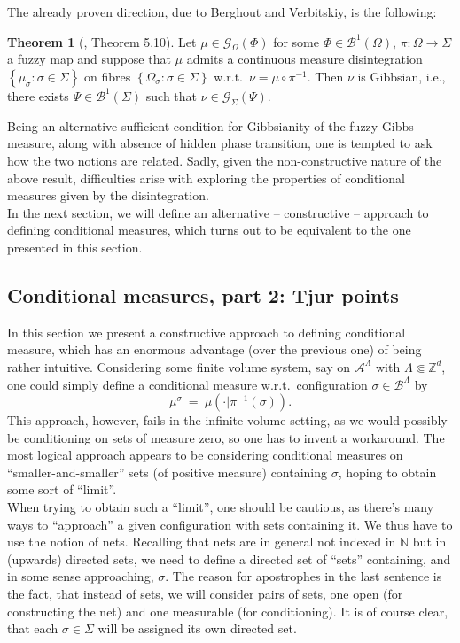 \documentclass[12pt]{article}
\newcommand{\A}{\mathcal{A}}
\newcommand{\B}{\mathcal{B}}
\newcommand{\BB}{\mathscr{B}}
\newcommand{\G}{\mathcal{G}}
\newcommand{\N}{\mathbb{N}}
\newcommand{\Z}{\mathbb{Z}}
\newcommand{\set}[1]{\left\{#1\right\}}
\newcommand{\ra}{\rightarrow}
\newcommand{\pika}{\boldsymbol{\cdot}}
\newcommand{\1}{\mathbbm{1}}
\newcommand{\5}{\vspace{0.5cm}}
\theoremstyle{definition}
\newtheorem{thm}{Theorem}[section]
\begin{document}
The already proven direction, due to Berghout and Verbitskiy, is the following:
\begin{thm}[\cite{Ber}, Theorem 5.10]\label{thm:DisinImpliesGibbs}
Let $\mu\in\G_\Omega(\Phi)$ for some $\Phi\in\BB^1(\Omega)$, $\pi:\Omega\ra\Sigma$ a fuzzy map and suppose that $\mu$ admits a continuous measure disintegration $\set{\mu_\sigma:\sigma\in\Sigma}$ on fibres $\set{\Omega_\sigma:\sigma\in\Sigma}$ w.r.t.~$\nu=\mu\circ\pi^{-1}$. Then $\nu$ is Gibbsian, i.e., there exists $\Psi\in\BB^1(\Sigma)$ such that $\nu\in\G_\Sigma(\Psi)$.
\end{thm}

Being an alternative sufficient condition for Gibbsianity of the fuzzy Gibbs measure, along with absence of hidden phase transition, one is tempted to ask how the two notions are related. Sadly, given the non-constructive nature of the above result, difficulties arise with exploring the properties of conditional measures given by the disintegration. \\

In the next section, we will define an alternative -- constructive -- approach to defining conditional measures, which turns out to be equivalent to the one presented in this section.


\subsection{Conditional measures, part 2: Tjur points}\label{sec:2.3}

In this section we present a constructive approach to defining conditional measure, which has an enormous advantage (over the previous one) of being rather intuitive. Considering some finite volume system, say on $\A^\Lambda$ with $\Lambda\Subset\Z^d$, one could simply define a conditional measure w.r.t.~configuration $\sigma\in\B^\Lambda$ by
$$\mu^\sigma ~=~ \mu(\pika|\pi^{-1}(\sigma)).$$
This approach, however, fails in the infinite volume setting, as we would possibly be conditioning on sets of measure zero, so one has to invent a workaround. The most logical approach appears to be considering conditional measures on ``smaller-and-smaller'' sets (of positive measure) containing $\sigma$, hoping to obtain some sort of ``limit''. \\

When trying to obtain such a ``limit'', one should be cautious, as there's many ways to ``approach'' a given configuration with sets containing it. We thus have to use the notion of nets. Recalling that nets are in general not indexed in $\N$ but in (upwards) directed sets, we need to define a directed set of ``sets'' containing, and in some sense approaching, $\sigma$. The reason for apostrophes in the last sentence is the fact, that instead of sets, we will consider pairs of sets, one open (for constructing the net) and one measurable (for conditioning). It is of course clear, that each $\sigma\in\Sigma$ will be assigned its own directed set.\\
\end{document}
